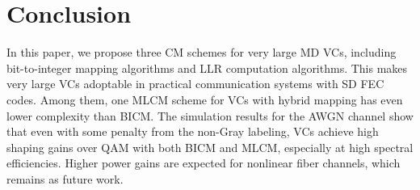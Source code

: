 \documentclass[journal]{IEEEtran}
\newcommand{\by}{\boldsymbol{y}}
\begin{document}
  




\section{Conclusion}
In this paper, we propose three CM schemes for very large MD VCs, including bit-to-integer mapping algorithms and LLR computation algorithms. This makes very large VCs adoptable in practical communication systems with SD FEC codes. Among them, one MLCM scheme for VCs with hybrid mapping has even lower complexity than BICM. The simulation results for the AWGN channel show that even with some penalty from the non-Gray labeling, VCs achieve high shaping gains over QAM with both BICM and MLCM, especially at high spectral efficiencies. Higher power gains are expected for nonlinear fiber channels, which remains as future work. 






%
\end{document}
